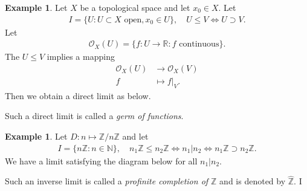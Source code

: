 \documentclass[12pt]{report}
\theoremstyle{plain}
\theoremstyle{remark}
\theoremstyle{definition}
\newtheorem{example}[theorem]{Example}
\newcommand{\N}{\mathbb{N}}
\newcommand{\Z}{\mathbb{Z}}
\newcommand{\R}{\mathbb{R}}
\begin{document}
\begin{example}
    Let $X$ be a topological space and let $x_0\in X$. Let
    \begin{align*}
        I=\{U:U\subset X\text{ open}, x_0\in U\},\quad U\le V\iff U\supset V.
    \end{align*}
    Let
    \begin{align*}
        \mathcal{O}_X(U)=\{f:U\to\R:f\text{ continuous}\}.
    \end{align*}
    The $U\le V$ implies a mapping
    \begin{align*}
        \mathcal{O}_X(U) &\to\mathcal{O}_X(V) \\
        f &\mapsto f|_V.
    \end{align*}
    Then we obtain a direct limit as below.
    \begin{figure}[H]
        \centering
    \end{figure}
    \noindent Such a direct limit is called a \emph{germ of functions}.
\end{example}

\begin{example}
    Let $D:n\mapsto \Z/n\Z$ and let
    \begin{align*}
        I=\{n\Z:n\in\N\},\quad n_1\Z\le n_2\Z \iff n_1|n_2\iff n_1\Z\supset n_2\Z.
    \end{align*}
    We have a limit satisfying the diagram below for all $n_1|n_2$.
    \begin{figure}[H]
        \centering
    \end{figure}
    \noindent Such an inverse limit is called a \emph{profinite completion of $\Z$} and is denoted by $\hat{\Z}$. I
\end{example}
\end{document}
